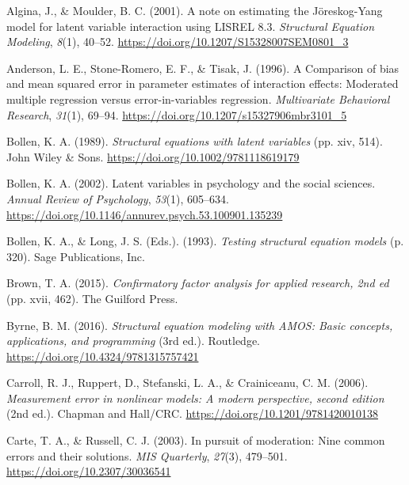 \documentclass[
  man]{apa6}
\newlength{\cslhangindent}
\newenvironment{CSLReferences}[2] %
 {\begin{list}{}{%
  \setlength{\itemindent}{0pt}
  \setlength{\leftmargin}{0pt}
  \setlength{\parsep}{0pt}
  \ifodd #1
   \setlength{\leftmargin}{\cslhangindent}
   \setlength{\itemindent}{-1\cslhangindent}
  \fi
  \setlength{\itemsep}{#2\baselineskip}}}
 {\end{list}}
\begin{document}
\label{refs}
\begin{CSLReferences}{1}{0}
Algina, J., \& Moulder, B. C. (2001). A note on estimating the {J{ö}reskog-Yang} model for latent variable interaction using {LISREL} 8.3. \emph{Structural Equation Modeling}, \emph{8}(1), 40--52. \url{https://doi.org/10.1207/S15328007SEM0801_3}

Anderson, L. E., Stone-Romero, E. F., \& Tisak, J. (1996). A {Comparison} of bias and mean squared error in parameter estimates of interaction effects: {Moderated} multiple regression versus error-in-variables regression. \emph{Multivariate Behavioral Research}, \emph{31}(1), 69--94. \url{https://doi.org/10.1207/s15327906mbr3101_5}

Bollen, K. A. (1989). \emph{Structural equations with latent variables} (pp. xiv, 514). John Wiley \& Sons. \url{https://doi.org/10.1002/9781118619179}

Bollen, K. A. (2002). Latent variables in psychology and the social sciences. \emph{Annual Review of Psychology}, \emph{53}(1), 605--634. \url{https://doi.org/10.1146/annurev.psych.53.100901.135239}

Bollen, K. A., \& Long, J. S. (Eds.). (1993). \emph{Testing structural equation models} (p. 320). Sage Publications, Inc.

Brown, T. A. (2015). \emph{Confirmatory factor analysis for applied research, 2nd ed} (pp. xvii, 462). The Guilford Press.

Byrne, B. M. (2016). \emph{Structural equation modeling with {AMOS}: {Basic} concepts, applications, and programming} (3rd ed.). Routledge. \url{https://doi.org/10.4324/9781315757421}

Carroll, R. J., Ruppert, D., Stefanski, L. A., \& Crainiceanu, C. M. (2006). \emph{Measurement error in nonlinear models: {A} modern perspective, second edition} (2nd ed.). {Chapman and Hall/CRC}. \url{https://doi.org/10.1201/9781420010138}

Carte, T. A., \& Russell, C. J. (2003). In pursuit of moderation: {Nine} common errors and their solutions. \emph{MIS Quarterly}, \emph{27}(3), 479--501. \url{https://doi.org/10.2307/30036541}


\end{CSLReferences}
\end{document}
